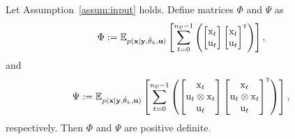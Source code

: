 \begin{lemma}\label{lem:PD_phi_psi}
Let Assumption~\ref{assum:input} holds. Define matrices $\Phi$ and $\Psi$ as
\begin{equation}
    \Phi :=    \mathbb{E}_{p(\mathbf{x}|\mathbf{y},\hat{\vctheta}_k,\mathbf{u})} \left[ \sum_{t=0}^{\nD - 1} \left(\begin{bmatrix}
        \vcx_t \\ \vcu_t
    \end{bmatrix}
    \begin{bmatrix}
        \vcx_t  \\ \vcu_t
    \end{bmatrix}^\tr \right)\right],
\end{equation}
and
\begin{equation}
    \Psi :=    \mathbb{E}_{p(\mathbf{x}|\mathbf{y},\hat{\vctheta}_k,\mathbf{u})} \left[ \sum_{t=0}^{\nD - 1} \left(\begin{bmatrix}
        \vcx_t \\ \vcu_t \otimes \vcx_t \\ \vcu_t
    \end{bmatrix}
    \begin{bmatrix}
        \vcx_t \\ \vcu_t \otimes \vcx_t \\ \vcu_t
    \end{bmatrix}^\tr \right)\right],
\end{equation}
respectively. Then $\Phi$ and $\Psi$ are positive definite. %
\end{lemma}
